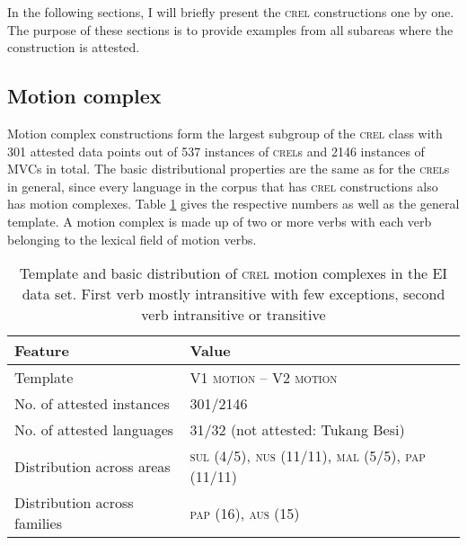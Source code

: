 In the following sections, I will briefly present the \textsc{crel} constructions one by one. The purpose of these sections is to provide examples from all subareas where the construction is attested.

\subsection{Motion complex} \label{sec:motioncomplex}

Motion complex constructions form the largest subgroup of the \textsc{crel} class with 301 attested data points out of 537 instances of \textsc{crel}s and 2146 instances of MVCs in total. The basic distributional properties are the same as for the \textsc{crel}s in general, since every language in the corpus that has \textsc{crel} constructions also has motion complexes. Table \ref{table:basiccrelmotion} gives the respective numbers as well as the general template. A motion complex is made up of two or more verbs with each verb belonging to the lexical field of motion verbs.

\begin{table}


\begin{tabular}{ll}
\lsptoprule
Feature&Value\tabularnewline
\hline
Template&V1 \textsc{motion} -- V2 \textsc{motion}\tabularnewline
No. of attested instances& 301/2146 \tabularnewline
No. of attested languages& 31/32 (not attested: Tukang Besi) \tabularnewline
Distribution across areas& \textsc{sul} (4/5), \textsc{nus} (11/11), \textsc{mal} (5/5), \textsc{pap} (11/11) \tabularnewline
Distribution across families& \textsc{pap} (16), \textsc{aus} (15) \tabularnewline
\hline
\end{tabular}
\caption[Template and basic distribution of \textsc{crel} motion complexes]{Template and basic distribution of \textsc{crel} motion complexes in the EI data set. First verb mostly intransitive with few exceptions, second verb intransitive or transitive}
\label{table:basiccrelmotion}
\end{table}


